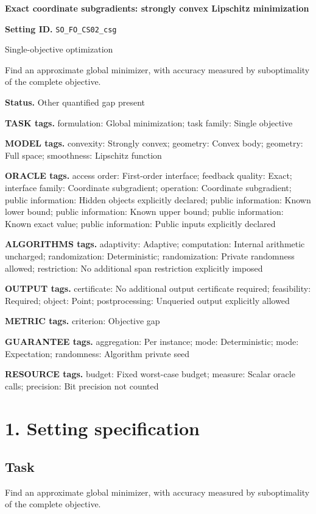 \documentclass[10pt,a4paper]{article}
\begin{document}
\raggedright

{\LARGE\bfseries\sffamily\color{AtlasNavy} Exact coordinate subgradients: strongly convex Lipschitz minimization\par}\vspace{5pt}
\textbf{Setting ID.} \texttt{SO\_\allowbreak{}FO\_\allowbreak{}CS02\_\allowbreak{}csg}

Single-objective optimization

Find an approximate global minimizer, with accuracy measured by suboptimality of the complete objective.

\textbf{Status.} Other quantified gap present

\textbf{TASK tags.} formulation: Global minimization; task family: Single objective

\textbf{MODEL tags.} convexity: Strongly convex; geometry: Convex body; geometry: Full space; smoothness: Lipschitz function

\textbf{ORACLE tags.} access order: First-order interface; feedback quality: Exact; interface family: Coordinate subgradient; operation: Coordinate subgradient; public information: Hidden objects explicitly declared; public information: Known lower bound; public information: Known upper bound; public information: Known exact value; public information: Public inputs explicitly declared

\textbf{ALGORITHMS tags.} adaptivity: Adaptive; computation: Internal arithmetic uncharged; randomization: Deterministic; randomization: Private randomness allowed; restriction: No additional span restriction explicitly imposed

\textbf{OUTPUT tags.} certificate: No additional output certificate required; feasibility: Required; object: Point; postprocessing: Unqueried output explicitly allowed

\textbf{METRIC tags.} criterion: Objective gap

\textbf{GUARANTEE tags.} aggregation: Per instance; mode: Deterministic; mode: Expectation; randomness: Algorithm private seed

\textbf{RESOURCE tags.} budget: Fixed worst-case budget; measure: Scalar oracle calls; precision: Bit precision not counted

\section{1. Setting specification}
\subsection{Task}
Find an approximate global minimizer, with accuracy measured by suboptimality of the complete objective.
\end{document}

